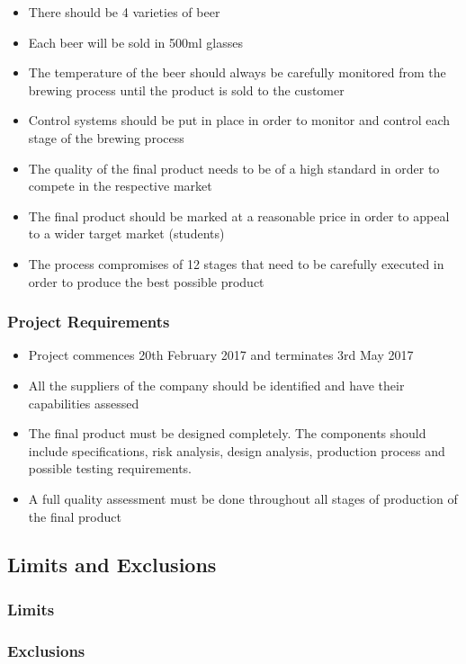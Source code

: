 \begin{itemize}
\item There should be 4 varieties of beer
\item Each beer will be sold in 500ml glasses
\item The temperature of the beer should always be carefully monitored from the brewing process until the product is sold to the customer 
\item Control systems should be put in place in order to monitor and control each stage of the brewing process 
\item The quality of the final product needs to be of a high standard in order to compete in the respective market 
\item The  final product should be marked at a reasonable price in order to appeal to a wider target market (students)
\item The process compromises of 12 stages that need to be carefully executed in order to produce the best possible product 
\end{itemize}
\subsubsection{Project Requirements}

\begin{itemize}
\item Project commences 20th February 2017 and terminates 3rd May 2017
\item All the suppliers of the company should be identified and have their capabilities assessed 
\item The final product must be designed completely. The components should include specifications, risk analysis, design analysis, production process and possible testing requirements.
\item A full quality assessment must be done throughout all stages of production of the final product
\end{itemize}

\subsection{Limits and Exclusions}
\subsubsection{Limits}
\subsubsection{Exclusions}
